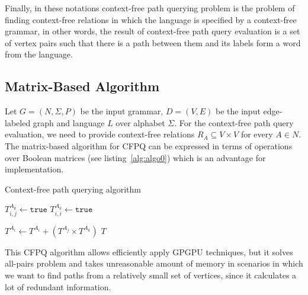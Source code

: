 Finally, in these notations context-free path querying problem is the problem of finding context-free relations in which the language is specified by a context-free grammar, in other words, the result of context-free path query evaluation is a set of vertex pairs such that there is a path between them and its labels form a word from the language.
 
\subsection{Matrix-Based Algorithm}
Let $G = (N, \Sigma, P)$ be the input grammar, $D = (V, E)$ be the input edge-labeled graph and language $L$ over alphabet $\Sigma$. For the context-free path query evaluation, we need to provide context-free relations \mbox{$R_A \subseteq V \times V$} for every \mbox{$A \in N$}.
The matrix-based algorithm for CFPQ can be expressed in terms of operations over Boolean matrices (see listing~\ref{alg:algo0}) which is an advantage for implementation.
{\footnotesize
\begin{algorithm}
\begin{algorithmic}[1]
\caption{Context-free path querying algorithm}
\label{alg:algo0}
          {$T^{A_k}_{i,j} \gets \texttt{true}$}
    \EndFor
            {$T^{A_k}_{i,i} \gets \texttt{true}$}
        \EndFor
    \EndFor

          { $T^{A_i} \gets T^{A_i} + (T^{A_j} \times T^{A_k})$ } 
        \EndFor
    \EndWhile
\State \Return $T$
\EndFunction
\end{algorithmic}
\end{algorithm}
}

This CFPQ algorithm allows efficiently apply GPGPU techniques, but it solves all-pairs problem and takes unreasonable amount of memory in scenarios in which we want to find paths from a relatively small set of vertices, since it calculates a lot of redundant information.  